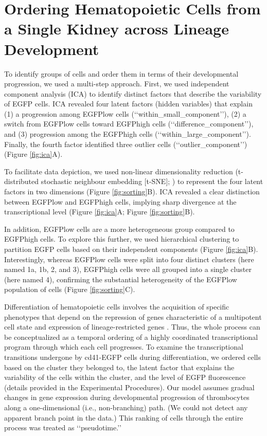 \section{Ordering Hematopoietic Cells from a Single Kidney across Lineage Development}

\begin{sloppypar}
To identify groups of cells and order them in terms of their developmental progression, we used a multi-step approach. First, we used independent component analysis (ICA) to identify distinct factors that describe the variability of EGFP cells. ICA revealed four latent factors (hidden variables) that explain (1) a progression among EGFPlow cells (‘‘within\_small\_component’’), (2) a switch from EGFPlow cells toward EGFPhigh cells (‘‘difference\_component’’), and (3) progression among the EGFPhigh cells (‘‘within\_large\_component’’). Finally, the fourth factor identified three outlier cells (‘‘outlier\_component’’) (Figure \ref{fig:ica}A).
\end{sloppypar}

To facilitate data depiction, we used non-linear dimensionality reduction (t-distributed stochastic neighbour embedding [t-SNE];  \cite{Van_der_Maaten2008-lh}) to represent the four latent factors in two dimensions (Figure \ref{fig:sorting}B). ICA revealed a clear distinction between EGFPlow and EGFPhigh cells, implying sharp divergence at the transcriptional level (Figure \ref{fig:ica}A; Figure \ref{fig:sorting}B).

In addition, EGFPlow cells are a more heterogeneous group compared to EGFPhigh cells. To explore this further, we used hierarchical clustering to partition EGFP cells based on their independent components (Figure \ref{fig:ica}B). Interestingly, whereas EGFPlow cells were split into four distinct clusters (here named 1a, 1b, 2, and 3), EGFPhigh cells were all grouped into a single cluster (here named 4), confirming the substantial heterogeneity of the EGFPlow population of cells (Figure \ref{fig:sorting}C).

Differentiation of hematopoietic cells involves the acquisition of specific phenotypes that depend on the repression of genes characteristic of a multipotent cell state and expression of lineage-restricted genes  \cite{Seita2010-mk}. Thus, the whole process can be conceptualized as a temporal ordering of a highly coordinated transcriptional program through which each cell progresses. To examine the transcriptional transitions undergone by cd41-EGFP cells during differentiation, we ordered cells based on the cluster they belonged to, the latent factor that explains the variability of the cells within the cluster, and the level of EGFP fluorescence (details provided in the Experimental Procedures). Our model assumes gradual changes in gene expression during developmental progression of thrombocytes along a one-dimensional (i.e., non-branching) path. (We could not detect any apparent branch point in the data.) This ranking of cells through the entire process was treated as ‘‘pseudotime.’’

